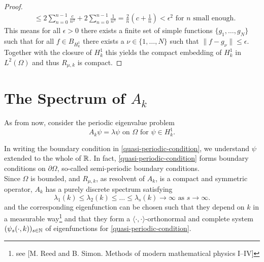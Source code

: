 \begin{theorem}
\begin{proof}
\begin{align*}
				& \leq 2 \sum_{n = 0}^{n-1} \frac{c}{n^{2}} + 2 \sum_{n=0}^{n-1} \frac{1}{n^{3}} = \frac{2}{n} \left( c + \frac{1}{n} \right) < \epsilon^{2} \text{ for } n \text{ small enough.}
		\end{align*}		 
		This means for all $\epsilon > 0$ there exists a finite set of simple functions $\{ g_{1}, \dotsc, g_{N} \}$ such that for all $f \in B_{H^{1}_{k}}$ there exists a $\nu \in \{1, \dotsc, N\}$ such that $\| f - g_{\nu} \| \leq \epsilon$. Together with the closure of $H^{1}_{k}$ this yields the compact embedding of $H^{1}_{k}$ in $L^{2}(\Omega)$ and thus $R_{\mu, k}$ is compact. %
	\end{proof}	
\end{theorem}		

\section{The Spectrum of $A_{k}$}		
As from now, consider the periodic eigenvalue problem
	\begin{equation}
		A_{k} \psi = \lambda \psi \text{ on } \Omega \text{ for } \psi \in H^{1}_{k}. \label{eigv-problem}
	\end{equation}

In writing the boundary condition in \eqref{quasi-periodic-condition}, we understand $\psi$ extended to the whole of $\mathbb{R}$. In fact, \eqref{quasi-periodic-condition} forms boundary conditions on $\partial \Omega$, so-called semi-periodic boundary conditions. \\
	
Since $\Omega$ is bounded, and $R_{\mu, k}$, as resolvent of $A_{k}$, is a compact and symmetric operator, $A_{k}$ has a purely discrete spectrum satisfying	
	\[ \lambda_{1}(k) \leq \lambda_{2}(k) \leq \dotsc \leq \lambda_{s}(k) \rightarrow \infty \text{ as } s \rightarrow \infty. \]
and the corresponding eigenfunction can be chosen such that they depend on $k$ in a measurable way\footnote{see [M. Reed and B. Simon. Methods of modern mathematical physics I–IV]} and that they form a $\langle \cdot , \cdot \rangle$-orthonormal and complete system $(\psi_{s}(\cdot, k))_{s \in \mathbb{N}}$ of eigenfunctions for \eqref{quasi-periodic-condition}.

